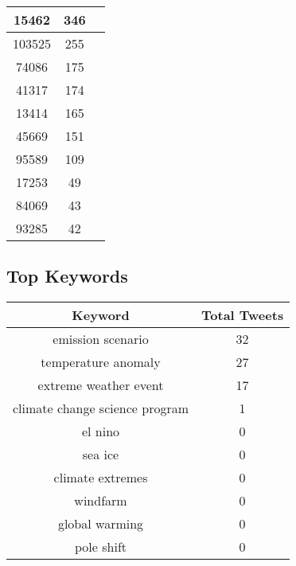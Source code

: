 \documentclass{article}\usepackage[T1]{fontenc}
\begin{document}
\begin{tabular}{|c|c|c|}
 \hline
15462 & 346\\ 
 \hline
103525 & 255\\ 
 \hline
74086 & 175\\ 
 \hline
41317 & 174\\ 
 \hline
13414 & 165\\ 
 \hline
45669 & 151\\ 
 \hline
95589 & 109\\ 
 \hline
17253 & 49\\ 
 \hline
84069 & 43\\ 
 \hline
93285 & 42\\ 
 \hline
\end{tabular}\subsection*{Top Keywords}\begin{tabular}{|c|c|}         \hline         Keyword & Total Tweets \\ 
 \hline
emission scenario & 32\\ 
 \hline
temperature anomaly & 27\\ 
 \hline
extreme weather event & 17\\ 
 \hline
climate change science program & 1\\ 
 \hline
el nino & 0\\ 
 \hline
sea ice & 0\\ 
 \hline
climate extremes & 0\\ 
 \hline
windfarm & 0\\ 
 \hline
global warming & 0\\ 
 \hline
pole shift & 0\\ 
 \hline
\end{tabular}
\end{document}
